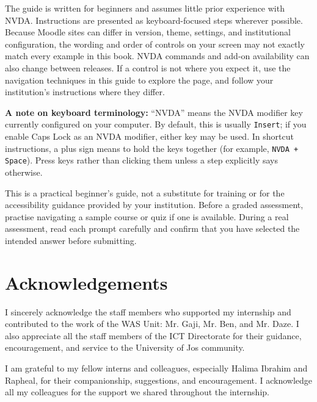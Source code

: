 \documentclass[11pt,oneside]{book}
\begin{document}
The guide is written for beginners and assumes little prior experience with NVDA. Instructions are presented as keyboard-focused steps wherever possible. Because Moodle sites can differ in version, theme, settings, and institutional configuration, the wording and order of controls on your screen may not exactly match every example in this book. NVDA commands and add-on availability can also change between releases. If a control is not where you expect it, use the navigation techniques in this guide to explore the page, and follow your institution's instructions where they differ.

\textbf{A note on keyboard terminology:} ``NVDA'' means the NVDA modifier key currently configured on your computer. By default, this is usually \texttt{Insert}; if you enable Caps Lock as an NVDA modifier, either key may be used. In shortcut instructions, a plus sign means to hold the keys together (for example, \texttt{NVDA + Space}). Press keys rather than clicking them unless a step explicitly says otherwise.

This is a practical beginner's guide, not a substitute for training or for the accessibility guidance provided by your institution. Before a graded assessment, practise navigating a sample course or quiz if one is available. During a real assessment, read each prompt carefully and confirm that you have selected the intended answer before submitting.

\chapter*{Acknowledgements}
I sincerely acknowledge the staff members who supported my internship and contributed to the work of the WAS Unit: Mr. Gaji, Mr. Ben, and Mr. Daze. I also appreciate all the staff members of the ICT Directorate for their guidance, encouragement, and service to the University of Jos community.

I am grateful to my fellow interns and colleagues, especially Halima Ibrahim and Rapheal, for their companionship, suggestions, and encouragement. I acknowledge all my colleagues for the support we shared throughout the internship.
\end{document}
